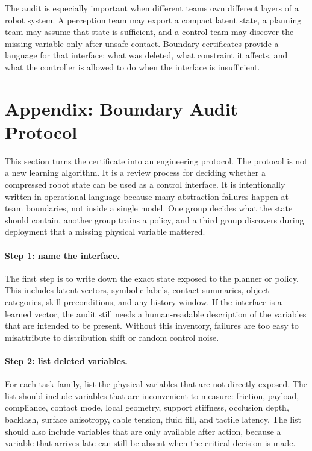 \documentclass{article}
\begin{document}
The audit is especially important when different teams own different layers of a
robot system. A perception team may export a compact latent state, a planning
team may assume that state is sufficient, and a control team may discover the
missing variable only after unsafe contact. Boundary certificates provide a
language for that interface: what was deleted, what constraint it affects, and
what the controller is allowed to do when the interface is insufficient.

\clearpage
\section{Appendix: Boundary Audit Protocol}

This section turns the certificate into an engineering protocol. The protocol is
not a new learning algorithm. It is a review process for deciding whether a
compressed robot state can be used as a control interface. It is intentionally
written in operational language because many abstraction failures happen at team
boundaries, not inside a single model. One group decides what the state should
contain, another group trains a policy, and a third group discovers during
deployment that a missing physical variable mattered.

\paragraph{Step 1: name the interface.}
The first step is to write down the exact state exposed to the planner or policy.
This includes latent vectors, symbolic labels, contact summaries, object
categories, skill preconditions, and any history window. If the interface is a
learned vector, the audit still needs a human-readable description of the
variables that are intended to be present. Without this inventory, failures are
too easy to misattribute to distribution shift or random control noise.

\paragraph{Step 2: list deleted variables.}
For each task family, list the physical variables that are not directly exposed.
The list should include variables that are inconvenient to measure: friction,
payload, compliance, contact mode, local geometry, support stiffness, occlusion
depth, backlash, surface anisotropy, cable tension, fluid fill, and tactile
latency. The list should also include variables that are only available after
action, because a variable that arrives late can still be absent when the
critical decision is made.
\end{document}

